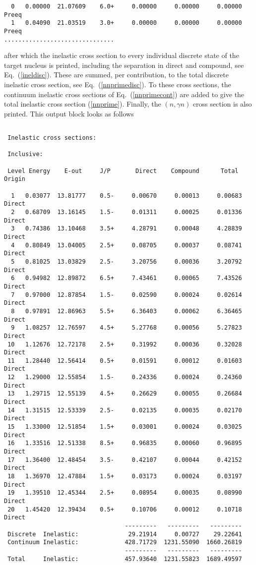\begin{samplecase}
{\begin{verbatim}
  0   0.00000  21.07609    6.0+     0.00000     0.00000     0.00000    Preeq
  1   0.04090  21.03519    3.0+     0.00000     0.00000     0.00000    Preeq
...............................
\end{verbatim} } \renewcommand{\baselinestretch}{1.07}\small\normalsize
\noindent
after which the inelastic cross section to every individual discrete state of 
the target nucleus is printed, including the separation in direct and compound, 
see Eq.~(\ref{ineldisc}). These are summed, per contribution, to the total 
discrete inelastic cross section, see Eq.~(\ref{nnprimedisc}). To these cross 
sections, the continuum inelastic cross sections of Eq.~(\ref{nnprimecont}) are 
added to give the total inelastic cross section (\ref{nnprime}). Finally, the
$(n,\gamma n)$ cross section is also printed. This output block looks as follows

{\small \begin{verbatim}

 Inelastic cross sections:

 Inclusive:

 Level Energy    E-out     J/P       Direct    Compound      Total     Origin

  1   0.03077  13.81777    0.5-     0.00670     0.00013     0.00683    Direct
  2   0.68709  13.16145    1.5-     0.01311     0.00025     0.01336    Direct
  3   0.74386  13.10468    3.5+     4.28791     0.00048     4.28839    Direct
  4   0.80849  13.04005    2.5+     0.08705     0.00037     0.08741    Direct
  5   0.81025  13.03829    2.5-     3.20756     0.00036     3.20792    Direct
  6   0.94982  12.89872    6.5+     7.43461     0.00065     7.43526    Direct
  7   0.97000  12.87854    1.5-     0.02590     0.00024     0.02614    Direct
  8   0.97891  12.86963    5.5+     6.36403     0.00062     6.36465    Direct
  9   1.08257  12.76597    4.5+     5.27768     0.00056     5.27823    Direct
 10   1.12676  12.72178    2.5+     0.31992     0.00036     0.32028    Direct
 11   1.28440  12.56414    0.5+     0.01591     0.00012     0.01603    Direct
 12   1.29000  12.55854    1.5-     0.24336     0.00024     0.24360    Direct
 13   1.29715  12.55139    4.5+     0.26629     0.00055     0.26684    Direct
 14   1.31515  12.53339    2.5-     0.02135     0.00035     0.02170    Direct
 15   1.33000  12.51854    1.5+     0.03001     0.00024     0.03025    Direct
 16   1.33516  12.51338    8.5+     0.96835     0.00060     0.96895    Direct
 17   1.36400  12.48454    3.5-     0.42107     0.00044     0.42152    Direct
 18   1.36970  12.47884    1.5+     0.03173     0.00024     0.03197    Direct
 19   1.39510  12.45344    2.5+     0.08954     0.00035     0.08990    Direct
 20   1.45420  12.39434    0.5+     0.10706     0.00012     0.10718    Direct
                                  ---------   ---------   ---------
 Discrete  Inelastic:              29.21914     0.00727    29.22641
 Continuum Inelastic:             428.71729  1231.55090  1660.26819
                                  ---------   ---------   ---------
 Total     Inelastic:             457.93640  1231.55823  1689.49597


\end{verbatim}}
\end{samplecase}
